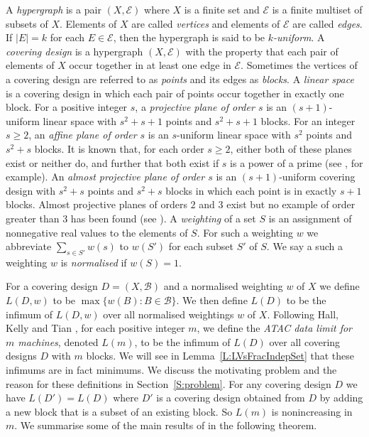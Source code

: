 \documentclass[11pt]{article}
\theoremstyle{definition}
\renewcommand{\geq}{\geqslant}
\newcommand{\B}{{\ensuremath{\mathcal{B}}}}
\newcommand{\E}{\mathcal{E}}
\begin{document}
A \emph{hypergraph} is a pair $(X,\E)$ where $X$ is a finite set and $\E$ is a finite multiset of subsets of $X$. Elements of $X$ are called \emph{vertices} and elements of $\E$ are called \emph{edges}. If $|E|=k$ for each $E \in \E$, then the hypergraph is said to be \emph{$k$-uniform}. A \emph{covering design} is a hypergraph $(X,\E)$ with the property that each pair of elements of $X$ occur together in at least one edge in $\E$. Sometimes the vertices of a covering design are referred to as \emph{points} and its edges as \emph{blocks}. A \emph{linear space} is a covering design in which each pair of points occur together in exactly one block. For a positive integer $s$, a \emph{projective plane of order $s$} is an $(s+1)$-uniform linear space with $s^2+s+1$ points and $s^2+s+1$ blocks. For an integer $s \geq 2$, an \emph{affine plane of order $s$} is an $s$-uniform linear space with $s^2$ points and $s^2+s$ blocks. It is known that, for each order $s \geq 2$, either both of these planes exist or neither do, and further that both exist if $s$ is a power of a prime (see \cite[\S2.3]{Sti}, for example).  An \emph{almost projective plane of order $s$} is an $(s+1)$-uniform covering design with $s^2+s$ points and $s^2+s$ blocks in which each point is in exactly $s+1$ blocks. Almost projective planes of orders $2$ and $3$ exist but no example of order greater than 3 has been found (see \cite{BieMarPam,BloJunSch}). A \emph{weighting} of a set $S$ is an assignment of nonnegative real values to the elements of $S$. For such a weighting $w$ we abbreviate $\sum_{s \in S'}w(s)$ to $w(S')$ for each subset $S'$ of $S$. We say a such a weighting $w$ is \emph{normalised} if $w(S)=1$.

For a covering design $D=(X,\B)$ and a normalised weighting $w$ of $X$ we define $L(D,w)$ to be $\max\{w(B):B \in \B\}$. We then define $L(D)$ to be the infimum of $L(D,w)$ over all normalised weightings $w$ of $X$. Following Hall, Kelly and Tian \cite{HalKelTia}, for each positive integer $m$, we define the \emph{ATAC data limit for $m$ machines}, denoted $L(m)$, to be the infimum of $L(D)$ over all covering designs $D$ with $m$ blocks. We will see in Lemma~\ref{L:LVsFracIndepSet} that these infimums are in fact minimums. We discuss the motivating problem and the reason for these definitions in Section~\ref{S:problem}. For any covering design $D$ we have $L(D')=L(D)$ where $D'$ is a covering design obtained from $D$ by adding a new block that is a subset of an existing block. So $L(m)$ is nonincreasing in $m$. We summarise some of the main results of \cite{HalKelTia} in the following theorem.
\end{document}
